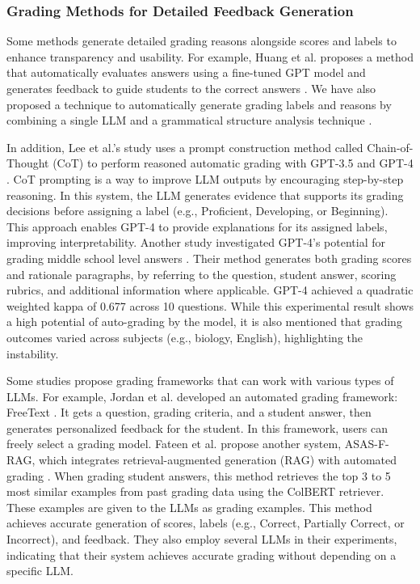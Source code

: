 \subsubsection{Grading Methods for Detailed Feedback Generation}
Some methods generate detailed grading reasons alongside scores and labels to enhance transparency and usability.
% 
For example, Huang et al. proposes a method that automatically evaluates answers using a fine-tuned GPT model and generates feedback to guide students to the correct answers \citep{direct}.
We have also proposed a technique to automatically generate grading labels and reasons by combining a single LLM and a grammatical structure analysis technique \citep{icetc}.

In addition, Lee et al.'s study \citep{cotscoring} uses a prompt construction method called Chain-of-Thought (CoT) to perform reasoned automatic grading with GPT-3.5 and GPT-4 \citep{cotscoring}.
CoT prompting is a way to improve LLM outputs by encouraging step-by-step reasoning.
In this system, the LLM generates evidence that supports its grading decisions before assigning a label (e.g., Proficient, Developing, or Beginning).
This approach enables GPT-4 to provide explanations for its assigned labels, improving interpretability.
% 
Another study investigated GPT-4's potential for grading middle school level answers \citep{sasgpt4}.
Their method generates both grading scores and rationale paragraphs, by referring to the question, student answer, scoring rubrics, and additional information where applicable.
GPT-4 achieved a quadratic weighted kappa of 0.677 across 10 questions.
While this experimental result shows a high potential of auto-grading by the model, it is also mentioned that grading outcomes varied across subjects (e.g., biology, English), highlighting the instability.

Some studies propose grading frameworks that can work with various types of LLMs.
For example, Jordan et al. developed an automated grading framework: FreeText \citep{freetext}.
It gets a question, grading criteria, and a student answer, then generates personalized feedback for the student.
In this framework, users can freely select a grading model.
Fateen et al. propose another system, ASAS-F-RAG, which integrates retrieval-augmented generation (RAG) with automated grading \citep{beyondscores}.
When grading student answers, this method retrieves the top 3 to 5 most similar examples from past grading data using the ColBERT retriever.
These examples are given to the LLMs as grading examples.
This method achieves accurate generation of scores, labels (e.g., Correct, Partially Correct, or Incorrect), and feedback.
They also employ several LLMs in their experiments, indicating that their system achieves accurate grading without depending on a specific LLM.

